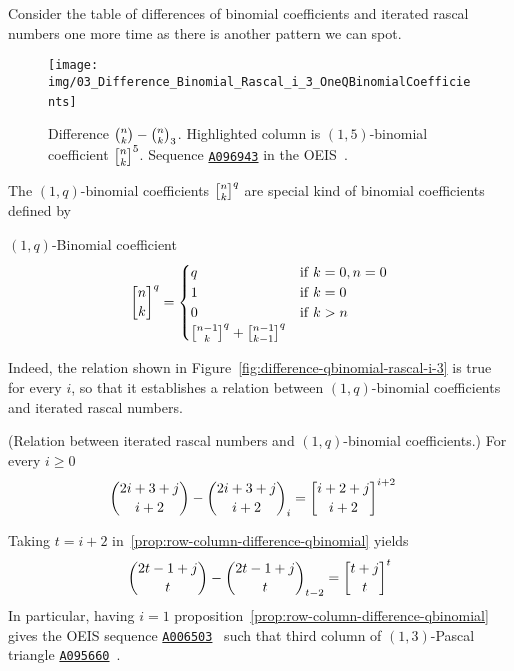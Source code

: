 ﻿Consider the table of differences of binomial coefficients and iterated rascal numbers one more time
as there is another pattern we can spot.
\begin{figure}[H]
    \centering
    \texttt{[image: img/03\_Difference\_Binomial\_Rascal\_i\_3\_OneQBinomialCoefficients]}
    ~\caption{Difference $\binom{n}{k}-\binom{n}{k}_{3}$.
    Highlighted column is $(1,5)$-binomial coefficient $\oneQBinomial{n}{k}{5}$.
    Sequence \href{https://oeis.org/A096943}{\texttt{A096943}} in the OEIS~\cite{sloane2004sixth}.}
    \label{fig:difference-qbinomial-rascal-i-3}
\end{figure}
The $(1,q)$-binomial coefficients $\oneQBinomial{n}{k}{q}$ are special kind of binomial coefficients defined by
\begin{definition}
    $(1,q)$-Binomial coefficient
    \begin{equation}
        \oneQBinomial{n}{k}{q} =
        \begin{cases}
            q & \mathrm{if} \; k=0, n=0 \\
            1 & \mathrm{if} \; k=0 \\
            0 & \mathrm{if} \; k > n \\
            \oneQBinomial{n-1}{k}{q} + \oneQBinomial{n-1}{k-1}{q}
        \end{cases}\label{eq:qbinomial-definition}
    \end{equation}
\end{definition}
Indeed, the relation shown in Figure~\eqref{fig:difference-qbinomial-rascal-i-3} is true for every $i$,
so that it establishes a relation between $(1,q)$-binomial coefficients and iterated rascal numbers.
\begin{proposition} (Relation between iterated rascal numbers and $(1,q)$-binomial coefficients.)
    For every $i\geq0$
    \label{prop:row-column-difference-qbinomial}
    \begin{align*}
        \binom{2i+3+j}{i+2} - \rascalNumber{2i+3+j}{i+2}{i} &= \oneQBinomial{i+2+j}{i+2}{i+2}
    \end{align*}
\end{proposition}
Taking $t=i+2$ in~\eqref{prop:row-column-difference-qbinomial} yields
\begin{align*}
    \binom{2t-1+j}{t} - \rascalNumber{2t-1+j}{t}{t-2} = \oneQBinomial{t+j}{t}{t}
\end{align*}
In particular, having $i=1$ proposition~\eqref{prop:row-column-difference-qbinomial}
gives the OEIS sequence \href{https://oeis.org/A006503}{\texttt{A006503}}~\cite{sloane1995n}
such that third column of $(1,3)$-Pascal triangle
\href{https://oeis.org/A095660}{\texttt{A095660}}~\cite{sloane2004pascal13}.

